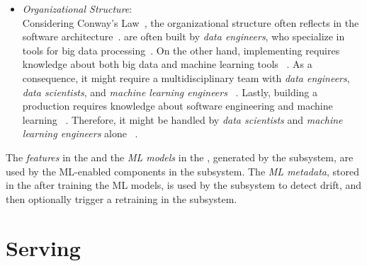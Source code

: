 \begin{itemize}
    \item \emph{Organizational Structure}: \\
          Considering Conway's Law~\parencite{Conway1968HowInvent},
          the organizational structure often reflects in the software
          architecture~\parencite{Richards2020FundamentalsApproach}.
           are often built by
          \emph{data engineers}, who specialize in tools for big data
          processing~\parencite{Kleppmann2017DesigningSystems,
          Reis2022FundamentalsSystems}.
          On the other hand, implementing  requires knowledge about both big data
          and machine learning tools%
          ~\parencite{Burkov2020MachineEngineering,Wilson2022MachineAction}.
          As a consequence, it might require a multidisciplinary team
          with \emph{data engineers}, \emph{data scientists},
          and \emph{machine learning engineers}%
          ~\parencite{Kim2018DataChallenges, 
          Nahar2022CollaborationProcess,Nahar2021MoreProjects}.
          Lastly, building a production 
          requires knowledge about software engineering and machine learning%
          ~\parencite{Burkov2020MachineEngineering,Wilson2022MachineAction}.
          Therefore, it might be handled by \emph{data scientists} and
          \emph{machine learning engineers} alone%
          ~\parencite{Kim2018DataChallenges,Nahar2022CollaborationProcess,
          Nahar2021MoreProjects}.
  \end{itemize}

  The \emph{features} in the 
  and the \emph{ML models} in the ,
  generated by the  subsystem,
  are used by the ML-enabled components in the  
  subsystem. The \emph{ML metadata}, stored in the
   after training the ML models,
  is used by the  subsystem to detect
  drift, and then optionally trigger a retraining in the
   subsystem.

  \section{Serving}
  \label{sec:ref_serving}

